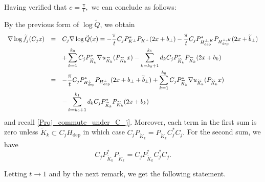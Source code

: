 \documentclass[11pt,a4paper,reqno]{amsart}
\numberwithin{equation}{section}
\theoremstyle{definition}
\newcommand{\nm}{\noalign{\smallskip}}
\newcommand{\ds}{\displaystyle}
\renewcommand{\tilde}{\widetilde}
\newcommand{\<}{\ensuremath \leq}
\renewcommand{\>}{\ensuremath \geq}
\renewcommand{\tilde}{\widetilde}
\begin{document}
Having verified that $c=\frac{\pi}{t},$ we can conclude as follows: 








By the previous form of $\log \tilde Q$, we obtain  $$\begin{array}{lll}
    \nabla \log \tilde f_j(C_jx) &=& \ds C_j\nabla \log \tilde Q(x)=-\frac{\pi}{t} C_jP_{K^\perp}^*P_{K^\perp}(2x+b_\perp)-\frac{\pi}{t} C_jP_{H_{\mathrm{dep}}^{\perp,K}}^*P_{H_{\mathrm{dep}}^{\perp,K}}(2x+\tilde b_\perp)  \\
    \nm 
    &&  \ds +\sum_{k=1}^{k_0}C_jP_{\tilde K_k}^*\nabla u_{\tilde K_k}(P_{\tilde K_k}x)-\sum_{k=k_0+1}^{k_1}d_kC_jP_{\tilde K_k}^*P_{\tilde K_k}(2x+b_k) \\
    \nm 
    &=& \ds -\frac{\pi}{t} C_jP_{H_{\mathrm{dep}}^\perp}^*P_{H_{\mathrm{dep}}^\perp}(2x+b_\perp+\tilde b_\perp)+\sum_{k=1}^{k_0}C_jP_{\tilde K_k}^*\nabla u_{\tilde K_k}(P_{\tilde K_k}x) \\
    \nm 
    && \ds -\sum_{k=k_0+1}^{k_1}d_kC_jP_{\tilde K_k}^*P_{\tilde K_k}(2x+b_k) 
\end{array}$$ and recall \cref{Proj_commute_under_C_j}. 
Moreover, each term in the first sum is zero unless $\tilde K_k \subset C_jH_{\mathrm{dep}}$ in which case $C_jP_{\tilde K_k}=P_{\tilde K_k}C_j^*C_j.$ For the second sum, we have $$C_jP_{\tilde K_k}^*P_{\tilde K_k}=C_jP_{\tilde K_k}^*C_j^*C_j.$$ 



Letting $t \rightarrow 1$ and by the next remark, we get the following statement. 
\end{document}
